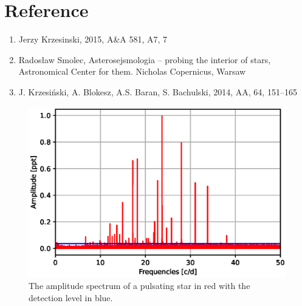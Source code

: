 \documentclass{aa}
\begin{document}
\section{Reference}
\begin{enumerate}
\item Jerzy Krzesinski, 2015, A\&A 581, A7, 7
\item Radosław Smolec, Asterosejsmologia – probing the interior of stars, Astronomical Center for them. Nicholas Copernicus, Warsaw
\item J. Krzesiński, A. Blokesz, A.S. Baran, S. Bachulski, 2014, AA, 64, 151–165
\end{enumerate}

\begin{figure}[h]
    \centering
    \includegraphics[scale=1]{images/transformat_fourier_frequencies_with_noise.eps}
    \caption{The amplitude spectrum of a pulsating star in red with the detection level in blue.}
    \label{fig:my_label_1}
\end{figure}
\end{document}
